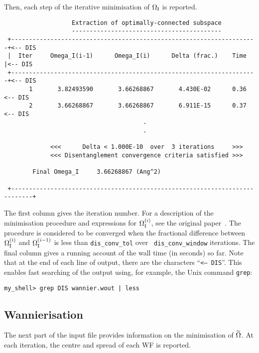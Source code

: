 Then, each step of the iterative minimisation of $\Omega_{\mathrm{I}}$ is reported. 
\begin{verbatim}                                   
                   Extraction of optimally-connected subspace                  
                   ------------------------------------------                  
 +---------------------------------------------------------------------+<-- DIS
 |  Iter     Omega_I(i-1)      Omega_I(i)      Delta (frac.)    Time   |<-- DIS
 +---------------------------------------------------------------------+<-- DIS
       1       3.82493590       3.66268867       4.430E-02      0.36    <-- DIS
       2       3.66268867       3.66268867       6.911E-15      0.37    <-- DIS
                                       .
                                       .
                                   
             <<<      Delta < 1.000E-10  over  3 iterations     >>>
             <<< Disentanglement convergence criteria satisfied >>>

        Final Omega_I     3.66268867 (Ang^2)

 +----------------------------------------------------------------------------+
\end{verbatim}
The first column gives the iteration number. For a description of the
minimisation procedure and expressions for $\Omega_{\mathrm{I}}^{(i)}$, see the
original paper~\cite{souza-prb01}. The procedure is considered to be
converged when the fractional difference between $\Omega_{\mathrm{I}}^{(i)}$ and
$\Omega_{\mathrm{I}}^{(i-1)}$ is less than {\tt dis\_conv\_tol} over {\tt
  dis\_conv\_window} iterations. The final column gives a running
account of the wall time (in seconds) so far. Note that at the end of
each line of output, there are the characters ``{\tt <-- DIS}''. This
enables fast searching of the output using, for example, the Unix
command {\tt grep}:

{\tt my\_shell> grep DIS wannier.wout | less}

\subsection{Wannierisation}

The next part of the input file provides information on the
minimisation of $\widetilde{\Omega}$. At each iteration, the centre and spread of
each WF is reported.

